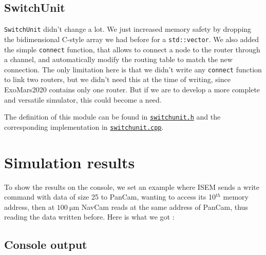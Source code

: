 \documentclass[12pt,a4paper]{article}
\begin{document}
\subsection{SwitchUnit}
\texttt{SwitchUnit} didn't change a lot. We just increased memory safety by dropping the bidimensional C-style array we had before for a \texttt{std::vector}. We also added the simple \texttt{connect} function, that allows to connect a node to the router through a channel, and automatically modify the routing table to match the new connection. The only limitation here is that we didn't write any \texttt{connect} function to link two routers, but we didn't need this at the time of writing, since ExoMars2020 contains only one router. But if we are to develop a more complete and versatile simulator, this could become a need.

The definition of this module can be found in \href{https://github.com/suai-ipsa2018/ExoMars2020/blob/master/ExoMars2020/Network/switchunit.h}{\texttt{switchunit.h}} and the corresponding implementation in \href{https://github.com/suai-ipsa2018/ExoMars2020/blob/master/ExoMars2020/Network/switchunit.cpp}{\texttt{switchunit.cpp}}.
\pagebreak

\section{Simulation results}

To show the results on the console, we set an example where ISEM sends a write command with data of size 25 to PanCam, wanting to access its 10$^{th}$ memory address, then at $\SI{100}{\micro\meter}$ NavCam reads at the same address of PanCam, thus reading the data written before. Here is what we got : \smallbreak

\subsection{Console output}
\end{document}
